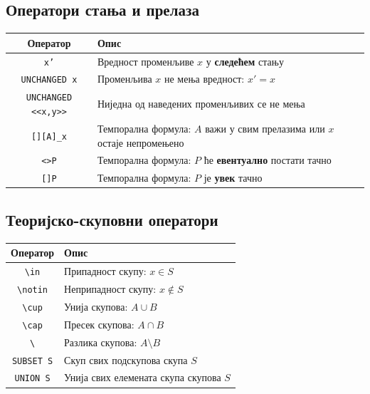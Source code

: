 \subsection{Оператори стања и прелаза}
\begin{center}
\begin{tabularx}{\textwidth}{|c|X|}
\hline
\textbf{Оператор} & \textbf{Опис} \\
\hline
\texttt{x'}              & Вредност променљиве $x$ у \textbf{следећем} стању \\
\texttt{UNCHANGED x}     & Променљива $x$ не мења вредност: $x' = x$ \\
\texttt{UNCHANGED <<x,y>>} & Ниједна од наведених променљивих се не мења \\
\texttt{[][A]\_x}        & Темпорална формула: $A$ важи у свим прелазима или $x$ остаје непромењено \\
\texttt{<>P}             & Темпорална формула: $P$ ће \textbf{евентуално} постати тачно \\
\texttt{[]P}             & Темпорална формула: $P$ је \textbf{увек} тачно \\
\hline
\end{tabularx}
\end{center}

\subsection{Теоријско-скуповни оператори}
\begin{center}
\begin{tabularx}{\textwidth}{|c|X|}
\hline
\textbf{Оператор} & \textbf{Опис} \\
\hline
\texttt{\textbackslash in}    & Припадност скупу: $x \in S$ \\
\texttt{\textbackslash notin} & Неприпадност скупу: $x \notin S$ \\
\texttt{\textbackslash cup}   & Унија скупова: $A \cup B$ \\
\texttt{\textbackslash cap}   & Пресек скупова: $A \cap B$ \\
\texttt{\textbackslash}       & Разлика скупова: $A \setminus B$ \\
\texttt{SUBSET S}             & Скуп свих подскупова скупа $S$ \\
\texttt{UNION S}              & Унија свих елемената скупа скупова $S$ \\
\hline
\end{tabularx}
\end{center}

